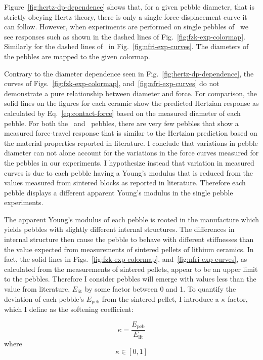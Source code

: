 Figure~\ref{fig:hertz-dp-dependence} shows that, for a given pebble diameter, that is strictly obeying Hertz theory, there is only a single force-displacement curve it can follow. However, when experiments are performed on single pebbles of \lis~we see responses such as shown in the dashed lines of Fig.~\ref{fig:fzk-exp-colormap}. Similarly for the dashed lines of \lit~in Fig.~\ref{fig:nfri-exp-curves}. The diameters of the pebbles are mapped to the given colormap.

Contrary to the diameter dependence seen in Fig.~\ref{fig:hertz-dp-dependence}, the curves of Figs.~\ref{fig:fzk-exp-colormap}, and~\ref{fig:nfri-exp-curves} do not demonstrate a pure relationship between diameter and force. For comparison, the solid lines on the figures for each ceramic show the predicted Hertzian response as calculated by Eq.~\ref{eq:contact-force} based on the measured diameter of each pebble. For both the \lis~and \lit~pebbles, there are very few pebbles that show a measured force-travel response that is similar to the Hertzian prediction based on the material properties reported in literature. I conclude that variations in pebble diameter can not alone account for the variations in the force curves measured for the pebbles in our experiments. I hypothesize instead that variation in measured curves is due to each pebble having a Young's modulus that is reduced from the values measured from sintered blocks as reported in literature. Therefore each pebble displays a different apparent Young's modulus in the single pebble experiments. 

The apparent Young's modulus of each pebble is rooted in the manufacture which yields pebbles with slightly different internal structures. The differences in internal structure then cause the pebble to behave with different stiffnesses than the value expected from measurements of sintered pellets of lithium ceramics. In fact, the solid lines in Figs.~\ref{fig:fzk-exp-colormap}, and~\ref{fig:nfri-exp-curves}, as calculated from the measurements of sintered pellets, appear to be an upper limit to the pebbles. Therefore I consider pebbles will emerge with values less than the value from literature, $E_\text{lit}$ by some factor between 0 and 1. To quantify the deviation of each pebble's $E_\text{peb}$ from the sintered pellet, I introduce a $\kappa$ factor, which I define as the softening coefficient:

\begin{equation}
\kappa = \frac{E_\text{peb}}{E_\text{lit}}
\end{equation}
where
\[
\kappa \in [0,1]
\]

